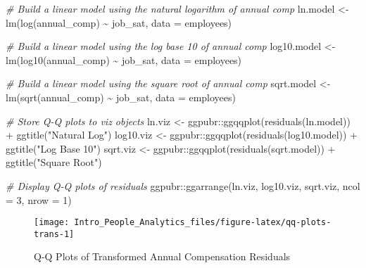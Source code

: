 \documentclass[
]{book}
\newenvironment{Shaded}{\begin{snugshade}}{\end{snugshade}}
\newcommand{\AttributeTok}[1]{\textcolor[rgb]{0.77,0.63,0.00}{#1}}
\newcommand{\CommentTok}[1]{\textcolor[rgb]{0.56,0.35,0.01}{\textit{#1}}}
\newcommand{\DecValTok}[1]{\textcolor[rgb]{0.00,0.00,0.81}{#1}}
\newcommand{\FunctionTok}[1]{\textcolor[rgb]{0.00,0.00,0.00}{#1}}
\newcommand{\NormalTok}[1]{#1}
\newcommand{\OtherTok}[1]{\textcolor[rgb]{0.56,0.35,0.01}{#1}}
\newcommand{\SpecialCharTok}[1]{\textcolor[rgb]{0.00,0.00,0.00}{#1}}
\newcommand{\StringTok}[1]{\textcolor[rgb]{0.31,0.60,0.02}{#1}}
\begin{document}
\begin{Shaded}
\begin{Highlighting}[]
\CommentTok{\# Build a linear model using the natural logarithm of annual comp}
\NormalTok{ln.model }\OtherTok{\textless{}{-}} \FunctionTok{lm}\NormalTok{(}\FunctionTok{log}\NormalTok{(annual\_comp) }\SpecialCharTok{\textasciitilde{}}\NormalTok{ job\_sat, }\AttributeTok{data =}\NormalTok{ employees)}

\CommentTok{\# Build a linear model using the log base 10 of annual comp}
\NormalTok{log10.model }\OtherTok{\textless{}{-}} \FunctionTok{lm}\NormalTok{(}\FunctionTok{log10}\NormalTok{(annual\_comp) }\SpecialCharTok{\textasciitilde{}}\NormalTok{ job\_sat, }\AttributeTok{data =}\NormalTok{ employees)}

\CommentTok{\# Build a linear model using the square root of annual comp}
\NormalTok{sqrt.model }\OtherTok{\textless{}{-}} \FunctionTok{lm}\NormalTok{(}\FunctionTok{sqrt}\NormalTok{(annual\_comp) }\SpecialCharTok{\textasciitilde{}}\NormalTok{ job\_sat, }\AttributeTok{data =}\NormalTok{ employees)}

\CommentTok{\# Store Q{-}Q plots to viz objects}
\NormalTok{ln.viz }\OtherTok{\textless{}{-}}\NormalTok{ ggpubr}\SpecialCharTok{::}\FunctionTok{ggqqplot}\NormalTok{(}\FunctionTok{residuals}\NormalTok{(ln.model)) }\SpecialCharTok{+} \FunctionTok{ggtitle}\NormalTok{(}\StringTok{"Natural Log"}\NormalTok{)}
\NormalTok{log10.viz }\OtherTok{\textless{}{-}}\NormalTok{ ggpubr}\SpecialCharTok{::}\FunctionTok{ggqqplot}\NormalTok{(}\FunctionTok{residuals}\NormalTok{(log10.model)) }\SpecialCharTok{+} \FunctionTok{ggtitle}\NormalTok{(}\StringTok{"Log Base 10"}\NormalTok{)}
\NormalTok{sqrt.viz }\OtherTok{\textless{}{-}}\NormalTok{ ggpubr}\SpecialCharTok{::}\FunctionTok{ggqqplot}\NormalTok{(}\FunctionTok{residuals}\NormalTok{(sqrt.model)) }\SpecialCharTok{+} \FunctionTok{ggtitle}\NormalTok{(}\StringTok{"Square Root"}\NormalTok{)}

\CommentTok{\# Display Q{-}Q plots of residuals}
\NormalTok{ggpubr}\SpecialCharTok{::}\FunctionTok{ggarrange}\NormalTok{(ln.viz, log10.viz, sqrt.viz,}
          \AttributeTok{ncol =} \DecValTok{3}\NormalTok{, }\AttributeTok{nrow =} \DecValTok{1}\NormalTok{)}
\end{Highlighting}
\end{Shaded}

\begin{figure}

{\centering \texttt{[image: Intro\_People\_Analytics\_files/figure-latex/qq-plots-trans-1]} 

}

\caption{Q-Q Plots of Transformed Annual Compensation Residuals}\label{fig:qq-plots-trans}
\end{figure}
\end{document}
